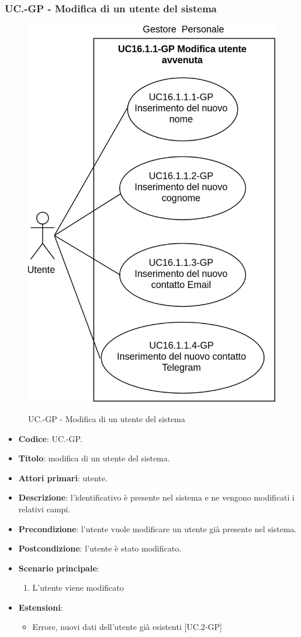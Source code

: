 		\subsubsection{UC\theuccount.\thesubuccount-GP - Modifica di un utente del sistema}
			\begin{figure}[H]
				\centering
				\includegraphics[width=0.6\columnwidth]{img/casi_d'uso/UC16_1_1.png}\\
				\caption{UC\theuccount.\thesubuccount-GP - Modifica di un utente del sistema}
			\end{figure}
			\begin{itemize}
				\item \textbf{Codice}: UC\theuccount.\thesubuccount-GP.
				\item \textbf{Titolo}: modifica di un utente del sistema.
				\item \textbf{Attori primari}: utente.
				\item \textbf{Descrizione}: l'identificativo è presente nel sistema e ne vengono modificati i relativi campi.
				\item \textbf{Precondizione}: l'utente vuole modificare un utente già presente nel sistema.
				\item \textbf{Postcondizione}: l'utente è stato modificato.
				\item \textbf{Scenario principale}:
				\begin{enumerate}
					\item L'utente viene modificato
				\end{enumerate}
				\item \textbf{Estensioni}:
				\begin{itemize}
					\item Errore, nuovi dati dell'utente già esistenti [UC\theuccount.2-GP]
				\end{itemize}
			\end{itemize}
			
